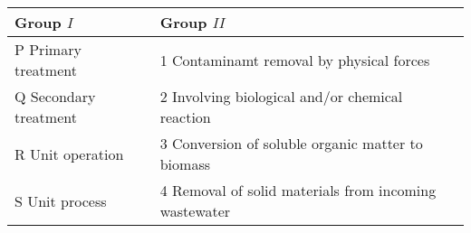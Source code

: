 \begin{center}
		
\begin{tabular}{ |l| l|}
\hline
Group $I$ &  Group $II$ \\ 
\hline
P Primary treatment& 1 Contaminamt removal by physical forces\\
\hline
Q Secondary treatment & 2 Involving biological and/or chemical reaction \\
\hline
R Unit operation & 3 Conversion of soluble organic matter to biomass \\
\hline
S Unit process &  4 Removal of solid materials from incoming wastewater \\
\hline


\end{tabular}
\end{center}
